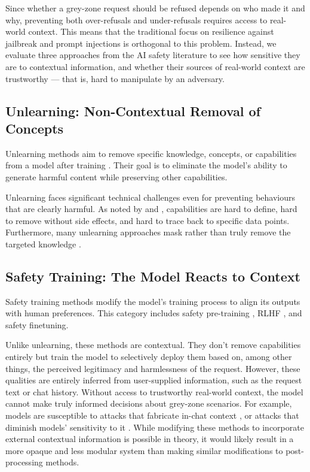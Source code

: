\documentclass{article}
\theoremstyle{plain}
\theoremstyle{definition}
\theoremstyle{remark}
\begin{document}
Since whether a grey-zone request should be refused depends on who made it and why, preventing both over-refusals and under-refusals requires access to real-world context.
This means that the traditional focus on resilience against jailbreak and prompt injections is orthogonal to this problem.
Instead, we evaluate three approaches from the AI safety literature to see how sensitive they are to contextual information, and whether their sources of real-world context are trustworthy --- that is, hard to manipulate by an adversary.

\subsection{Unlearning: Non-Contextual Removal of Concepts}

Unlearning methods aim to remove specific knowledge, concepts, or capabilities from a model after training \cite{liu2024rethinkingmachineunlearninglarge}.
Their goal is to eliminate the model's ability to generate harmful content while preserving other capabilities.

Unlearning faces significant technical challenges even for preventing behaviours that are clearly harmful.
As noted by \citet{cooper2024machineunlearningdoesntthink} and \citet{barez2025openproblemsmachineunlearning}, capabilities are hard to define, hard to remove without side effects, and hard to trace back to specific data points.
Furthermore, many unlearning approaches mask rather than truly remove the targeted knowledge \cite{deeb2025unlearningmethodsremoveinformation}.

\subsection{Safety Training: The Model Reacts to Context}

Safety training methods modify the model's training process to align
its outputs with human preferences.
This category includes safety pre-training \cite{maini2025safetypretraininggenerationsafe}, RLHF \cite{christiano2023deepreinforcementlearninghuman}, and safety finetuning.

Unlike unlearning, these methods are contextual.
They don't remove capabilities entirely but train the model to selectively deploy them based on, among other things, the perceived legitimacy and harmlessness of the request.
However, these qualities are entirely inferred from user-supplied information, such as the request text or chat history.
Without access to trustworthy real-world context, the model cannot make truly informed decisions about grey-zone scenarios.
For example, models are susceptible to attacks that fabricate in-chat context \cite{zeng2024johnnypersuadellmsjailbreak}, or attacks that diminish models' sensitivity to it \cite{russinovich2025greatwritearticlethat}.
While modifying these methods to incorporate external contextual information is possible in theory, it would likely result in a more opaque and less modular system than making similar modifications to post-processing methods.
\end{document}
